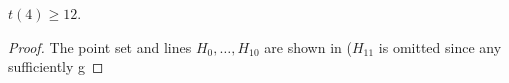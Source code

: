 \documentclass{cccg10}
\begin{document}
\begin{lem}
$t(4) \ge 12$.
\end{lem}

\begin{proof}
The point set and lines $H_0,\ldots,H_{10}$ are shown in 
($H_{11}$ is omitted since any sufficiently g
\end{proof}
\end{document}
